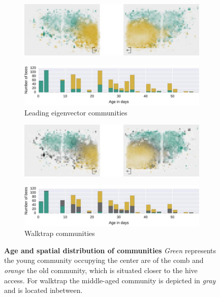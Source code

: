 \begin{figure}[!htb]
	\centering
	\begin{subfigure}[b]{1.0\textwidth}
	\centering
	\includegraphics[width=1.0\textwidth]{Figures/le_network3}
	\end{subfigure} 
	\begin{subfigure}[b]{1.0\textwidth}
	\centering
	\includegraphics[width=1.0\textwidth]{Figures/n3-ageDistribution-LE}
	\caption[Leading eigenvector communities]{Leading eigenvector communities}
	\label{fig:n3ageLE}
	\end{subfigure}
	\begin{subfigure}[b]{1.0\textwidth}
	\vspace{5mm}
	\centering
	\includegraphics[width=1.0\textwidth]{Figures/wt_network3}
	\end{subfigure}
	\begin{subfigure}[b]{1.0\textwidth}
	\centering
	\includegraphics[width=1.0\textwidth]{Figures/n3-ageDistribution-WT}
	\caption[Walktrap communities]{Walktrap communities}
	\label{fig:n3ageWT}
	\end{subfigure}
	\caption[Age and spatial distribution of communities]{\textbf{Age and spatial distribution of communities} \emph{Green} represents the young community occupying the center are of the comb and \emph{orange} the old community, which is situated closer to the hive access. For walktrap the middle-aged community is depicted in \emph{gray} and is located inbetween.}
	\label{fig:n3-communities}
\end{figure}